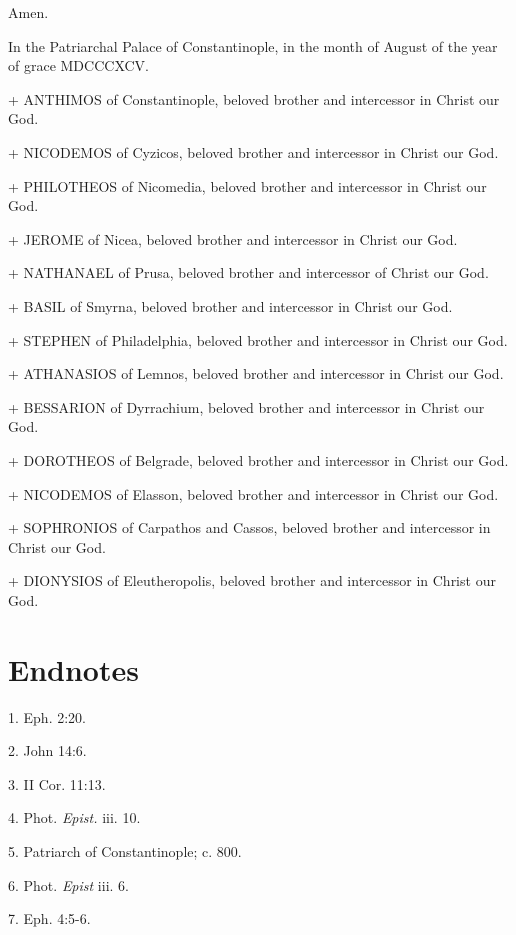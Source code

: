 Amen.

In the Patriarchal Palace of Constantinople, in the month of August of
the year of grace MDCCCXCV.

+ ANTHIMOS of Constantinople, beloved brother and intercessor in Christ
our God.

+ NICODEMOS of Cyzicos, beloved brother and intercessor in Christ our
God.

+ PHILOTHEOS of Nicomedia, beloved brother and intercessor in Christ our
God.

+ JEROME of Nicea, beloved brother and intercessor in Christ our God.

+ NATHANAEL of Prusa, beloved brother and intercessor of Christ our God.

+ BASIL of Smyrna, beloved brother and intercessor in Christ our God.

+ STEPHEN of Philadelphia, beloved brother and intercessor in Christ our
God.

+ ATHANASIOS of Lemnos, beloved brother and intercessor in Christ our
God.

+ BESSARION of Dyrrachium, beloved brother and intercessor in Christ our
God.

+ DOROTHEOS of Belgrade, beloved brother and intercessor in Christ our
God.

+ NICODEMOS of Elasson, beloved brother and intercessor in Christ our
God.

+ SOPHRONIOS of Carpathos and Cassos, beloved brother and intercessor in
Christ our God.

+ DIONYSIOS of Eleutheropolis, beloved brother and intercessor in Christ
our God.

\section{Endnotes}\label{endnotes}

1. Eph. 2:20.

2. John 14:6.

3. II Cor. 11:13.

4. Phot. \emph{Epist.} iii. 10.

5. Patriarch of Constantinople; c. 800.

6. Phot. \emph{Epist} iii. 6.

7. Eph. 4:5-6.


